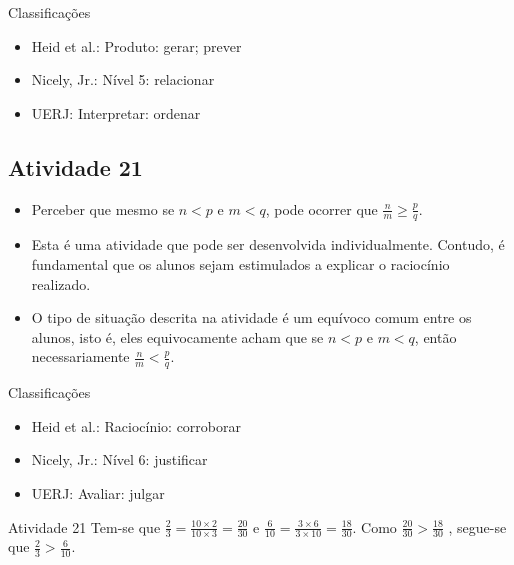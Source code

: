 \documentclass[oneside]{book}
\begin{document}
\begin{multicols}{2}
  Classificações  
\begin{itemize} %
    \item       Heid et al.: Produto: gerar; prever
    \item       Nicely, Jr.: Nível 5: relacionar
    \item       UERJ: Interpretar: ordenar
\end{itemize} %
  
  
\subsection{Atividade 21}

\begin{itemize} %
    \item       Perceber que mesmo se       $n < p$       e       $m < q$, pode 
ocorrer que       $\frac{n}{m} \geq \frac{p}{q}$.
\end{itemize} %
  
  
  
\begin{itemize} %
    \item       Esta é uma atividade que pode ser desenvolvida individualmente. 
Contudo, é fundamental que os alunos sejam estimulados a explicar o raciocínio 
realizado.
    \item       O tipo de situação descrita na atividade é um equívoco comum 
entre os alunos, isto é, eles equivocamente acham que se       $n < p$       e   
    $m < q$, então necessariamente       $\frac{n}{m} < \frac{p}{q}$.
\end{itemize} %
  
  
  Classificações  
\begin{itemize} %
    \item       Heid et al.: Raciocínio: corroborar
    \item       Nicely, Jr.: Nível 6: justificar
    \item       UERJ: Avaliar: julgar
\end{itemize} %

\begin{resposta*}{Atividade 21}
  Tem-se que   $\frac{2}{3} = \frac{10 \times 2}{10 \times 3} = \frac{20}{30}$   
e  
  $\frac{6}{10} = \frac{3 \times 6}{3 \times 10} = \frac{18}{30}$.  
  Como   $\frac{20}{30} > \frac{18}{30}$  , segue-se que   $\frac{2}{3} > 
\frac{6}{10}$.  
\end{resposta*}


\end{multicols}
\end{document}
